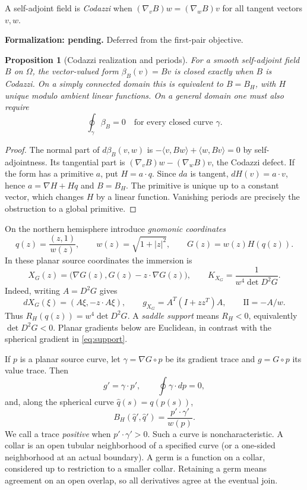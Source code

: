 \documentclass[11pt]{amsart}
\newtheorem{proposition}[theorem]{Proposition}
\theoremstyle{definition}
\theoremstyle{remark}
\newcommand{\II}{\mathrm{II}}\newcommand{\Gmap}{\mathcal G}
\numberwithin{equation}{section}
\begin{document}
A self-adjoint field is \emph{Codazzi} when
$(\nabla_vB)w=(\nabla_wB)v$ for all tangent vectors $v,w$.
\par\noindent\textbf{Formalization: pending.} Deferred from the first-pair objective.\par
\begin{proposition}[Codazzi realization and periods]\label{prop:codazzi}
For a smooth self-adjoint field $B$ on $\Omega$, the vector-valued form
$\beta_B(v)=Bv$ is closed exactly when $B$ is Codazzi. On a simply
connected domain this is equivalent to $B=B_H$, with $H$ unique modulo
ambient linear functions. On a general domain one must also require
\[
 \oint_\gamma\beta_B=0\quad\text{for every closed curve }\gamma.
\]
\end{proposition}
\begin{proof}
The normal part of $d\beta_B(v,w)$ is
$-\langle v,Bw\rangle+\langle w,Bv\rangle=0$ by self-adjointness.
Its tangential part is $(\nabla_vB)w-(\nabla_wB)v$, the Codazzi defect.
If the form has a primitive $a$, put $H=a\cdot q$. Since $da$ is tangent,
$dH(v)=a\cdot v$, hence $a=\nabla H+Hq$ and $B=B_H$.
The primitive is unique up to a constant vector, which changes $H$ by a
linear function. Vanishing periods are precisely the obstruction to a
global primitive.
\end{proof}

On the northern hemisphere introduce \emph{gnomonic coordinates}
\[
 q(z)=\frac{(z,1)}{w(z)},\qquad w(z)=\sqrt{1+|z|^2},
 \qquad G(z)=w(z)H(q(z)).
\]
In these planar source coordinates the immersion is
\begin{equation}\label{eq:planar}
 X_G(z)=\bigl(\nabla G(z),G(z)-z\cdot\nabla G(z)\bigr),
 \qquad K_{X_G}=\frac1{w^4\det D^2G}.
\end{equation}
Indeed, writing $A=D^2G$ gives
\[
 dX_G(\xi)=(A\xi,-z\cdot A\xi),\qquad
 g_{X_G}=A^T(I+zz^T)A,\qquad \II=-A/w.
\]
Thus $R_H(q(z))=w^4\det D^2G$. A \emph{saddle support} means
$R_H<0$, equivalently $\det D^2G<0$. Planar gradients below are
Euclidean, in contrast with the spherical gradient in \eqref{eq:support}.

If $p$ is a planar source curve, let $\gamma=\nabla G\circ p$ be its
gradient trace and $g=G\circ p$ its value trace. Then
\begin{equation}\label{eq:action}
 g'=\gamma\cdot p',\qquad \oint\gamma\cdot dp=0,
\end{equation}
and, along the spherical curve $\widehat q(s)=q(p(s))$,
\begin{equation}\label{eq:tangent-sign}
 B_H(\widehat q',\widehat q')=\frac{p'\cdot\gamma'}{w(p)}.
\end{equation}
We call a trace \emph{positive} when $p'\cdot\gamma'>0$.
Such a curve is noncharacteristic. A collar is an open tubular
neighborhood of a specified curve (or a one-sided neighborhood at an
actual boundary). A germ is a function on a collar, considered up to restriction
to a smaller collar. Retaining a germ means agreement on an open overlap,
so all derivatives agree at the eventual join.
\end{document}

